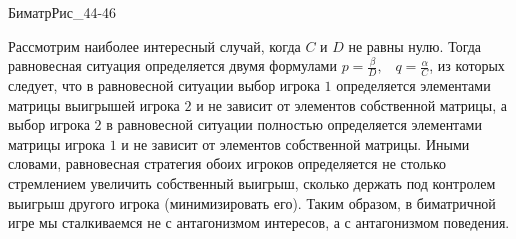 БиматрРис_44-46



Рассмотрим наиболее интересный случай, когда
$C $ и $D $ не равны нулю.  Тогда равновесная ситуация определяется
двумя формулами $ p=\frac{\beta}{D},$ \, $q=\frac{\alpha }{C}$, из которых
следует, что в равновесной ситуации выбор игрока $ 1$ определяется
элементами матрицы выигрышей игрока $ 2$ и не зависит от элементов
собственной матрицы, а выбор игрока $ 2$ в равновесной ситуации
полностью определяется элементами матрицы игрока $1 $ и не зависит от
элементов собственной матрицы. Иными словами, равновесная стратегия
обоих игроков определяется не столько стремлением увеличить
собственный выигрыш, сколько держать под контролем выигрыш другого
игрока (минимизировать его). Таким образом, в биматричной игре мы
сталкиваемся не с антагонизмом интересов, а с антагонизмом поведения.


